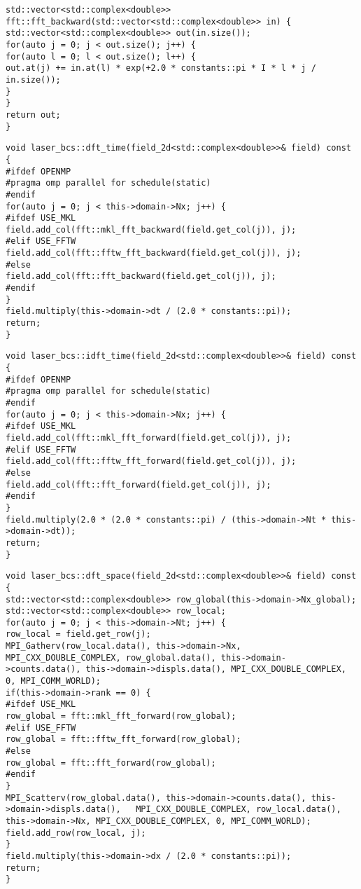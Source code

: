 \begin{lstlisting}[style=CXX, caption=Function performing backward discrete Fourier transform without using any library]
std::vector<std::complex<double>> fft::fft_backward(std::vector<std::complex<double>> in) {
std::vector<std::complex<double>> out(in.size());
for(auto j = 0; j < out.size(); j++) {
for(auto l = 0; l < out.size(); l++) {
out.at(j) += in.at(l) * exp(+2.0 * constants::pi * I * l * j / in.size());
}
}
return out;
}
\end{lstlisting}

\begin{lstlisting}[style=CXX, caption=Method for performing discrete Fourier transform in time]
void laser_bcs::dft_time(field_2d<std::complex<double>>& field) const {
#ifdef OPENMP
#pragma omp parallel for schedule(static)
#endif
for(auto j = 0; j < this->domain->Nx; j++) {
#ifdef USE_MKL
field.add_col(fft::mkl_fft_backward(field.get_col(j)), j);
#elif USE_FFTW
field.add_col(fft::fftw_fft_backward(field.get_col(j)), j);
#else
field.add_col(fft::fft_backward(field.get_col(j)), j);
#endif
}
field.multiply(this->domain->dt / (2.0 * constants::pi));
return;
}
\end{lstlisting}

\begin{lstlisting}[style=CXX, caption=Method for performing inverse discrete Fourier transform in time]
void laser_bcs::idft_time(field_2d<std::complex<double>>& field) const {
#ifdef OPENMP
#pragma omp parallel for schedule(static)
#endif
for(auto j = 0; j < this->domain->Nx; j++) {
#ifdef USE_MKL
field.add_col(fft::mkl_fft_forward(field.get_col(j)), j);
#elif USE_FFTW
field.add_col(fft::fftw_fft_forward(field.get_col(j)), j);
#else
field.add_col(fft::fft_forward(field.get_col(j)), j);
#endif
}
field.multiply(2.0 * (2.0 * constants::pi) / (this->domain->Nt * this->domain->dt));
return;
}
\end{lstlisting}

\begin{lstlisting}[style=CXX, caption=Method for performing discrete Fourier transform in space]
void laser_bcs::dft_space(field_2d<std::complex<double>>& field) const {
std::vector<std::complex<double>> row_global(this->domain->Nx_global);
std::vector<std::complex<double>> row_local;
for(auto j = 0; j < this->domain->Nt; j++) {
row_local = field.get_row(j);
MPI_Gatherv(row_local.data(), this->domain->Nx, MPI_CXX_DOUBLE_COMPLEX, row_global.data(), this->domain->counts.data(), this->domain->displs.data(), MPI_CXX_DOUBLE_COMPLEX, 0, MPI_COMM_WORLD);
if(this->domain->rank == 0) {
#ifdef USE_MKL
row_global = fft::mkl_fft_forward(row_global);
#elif USE_FFTW
row_global = fft::fftw_fft_forward(row_global);
#else
row_global = fft::fft_forward(row_global);
#endif
}
MPI_Scatterv(row_global.data(), this->domain->counts.data(), this->domain->displs.data(), 	MPI_CXX_DOUBLE_COMPLEX, row_local.data(), this->domain->Nx, MPI_CXX_DOUBLE_COMPLEX, 0, MPI_COMM_WORLD);
field.add_row(row_local, j);
}
field.multiply(this->domain->dx / (2.0 * constants::pi));
return;
}
\end{lstlisting}

